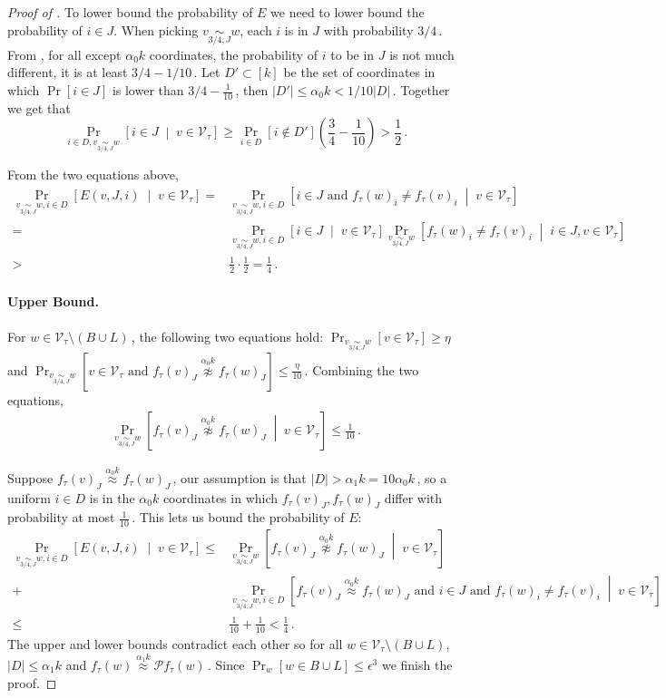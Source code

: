 \documentclass[11pt]{article}
\numberwithin{equation}{section}
\theoremstyle{definition}
\theoremstyle{plain}
\newcommand{\Prob}[2][]{\Pr_{{#1}}\left[#2\right]} %
\newcommand{\Paren}[1]{\left(#1\right)} %
\newcommand{\abs}[1]{\lvert#1\rvert} %
\newcommand{\given}{\;\middle\vert\;} %
\newcommand\f{f} %
\newcommand\bh{\mathcal{P}\f_\tau} %
\newcommand\neql[1]{\stackrel{{#1}}{ \approx}} %
\newcommand\neqg[1]{\stackrel{{#1}}{ \not\approx}} %
\newcommand\cons{\mathcal{V}} %
\newcommand\cor[1]{\underset{\scriptscriptstyle#1}{\sim}} %
\begin{document}
\begin{proof}[Proof of ]
	To lower bound the probability of $E$ we need to lower bound the probability of $i\in J$. When picking $v\cor{3/4,J}w$, each $i$ is in $J$ with probability 
	$3/4$\,. %
   {}From , for all except $\alpha_0 k$ coordinates, the probability of $i$ to be in $J$ is not much different, it is at least 
	$3/4-1/10$\,. Let $D'\subset [k]$ be the set of coordinates in which $\Pr[i\in J]$ is lower than $3/4-\frac{1}{10}$\,, then $\abs{D'}\leq\alpha_0 k <1/10\abs{D}$\,. %
	Together we get that
	\[ \Prob[i\in D,v\cor{3/4,J}w]{i\in J\given v\in \cons_\tau}\geq \Pr_{i\in D}[i\notin D']\Paren{\frac{3}{4}-\frac{1}{10}} > \frac{1}{2}\,. \] %
	

    From the two equations above,
	\begin{align*}
	\Prob[v\cor{3/4,J}w,i\in D]{E(v,J,i)\given v\in \cons_\tau} =& \Prob[v\cor{3/4,J}w,i\in D]{i\in J\textrm{ and }\f_\tau(w)_i \neq \f_\tau(v)_i \given v\in \cons_\tau} \\
	=&\Prob[v\cor{3/4,J}w,i\in D]{i\in J\given v\in \cons_\tau}\Prob[v\cor{3/4,J}w]{\f_\tau(w)_i \neq \f_\tau(v)_i\given i\in J,v\in \cons_\tau} \\
	>&  \frac{1}{2}\cdot\frac{1}{2}=\frac{1}{4}\,. %
	\end{align*}

	
	\paragraph*{Upper Bound.} 
	For $w \in \cons_\tau\setminus(B\cup L)$\,, the following two equations hold: $\Prob[v\cor{3/4,J}w]{v\in \cons_\tau}\geq\eta$ and
	$\Prob[v\cor{3/4,J}w]{v\in \cons_\tau \textrm{ and }\f_\tau(v)_J\neqg{\alpha_0 k}\f_\tau(w)_J}\leq\frac{\eta}{10}$\,. Combining the two equations,
	\begin{align}\label{eq:good w}
	\Prob[v\cor{3/4,J}w]{\f_\tau(v)_J\neqg{\alpha_0 k}\f_\tau(w)_J\given v\in \cons_\tau}\leq\frac{1}{10}\,.%
	\end{align}
	
	Suppose $\f_\tau(v)_J\neql{\alpha_0 k}\f_\tau(w)_J$\,, our assumption is that $\abs{D}>\alpha_1 k= 10\alpha_0 k$\,, so a uniform $i\in D$ is in the $\alpha_0 k$ coordinates in which $\f_\tau(v)_J,\f_\tau(w)_J$ differ with probability at most $\frac{1}{10}$\,. This lets us bound the probability of $E$:
	\begin{align*}
	\Prob[v\cor{3/4,J}w,i\in D]{E(v,J,i)\given v\in \cons_\tau} \leq& \Prob[v\cor{3/4,J}w]{\f_\tau(v)_J\neqg{\alpha_0 k}\f_\tau(w)_J\given v\in \cons_\tau} \\
	+& \Prob[v\cor{3/4,J}w,i\in D]{  \f_\tau(v)_J\neql{\alpha_0 k}\f_\tau(w)_J\textrm{ and }i\in J \textrm{ and }\f_\tau(w)_i \neq \f_\tau(v)_i\given v \in \cons_\tau}\\
	\leq&  \frac{1}{10} + \frac{1}{10} < \frac{1}{4}\,. %
	\end{align*}
	The upper and lower bounds contradict each other so for all $w\in \cons_\tau\setminus (B\cup L)$, $\abs{D}\leq \alpha_1 k$ and $\f_\tau(w) \neql{\alpha_1 k} \bh(w)$\,. Since $\Pr_w[w\in B\cup L]\leq\epsilon^3$ we finish the proof.
\end{proof}
\end{document}
